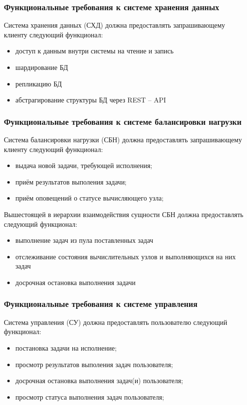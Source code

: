 \documentclass[a4paper,12pt]{report}
\numberwithin{equation}{section}
\begin{document}
\subsubsection{Функциональные требования к системе хранения данных}
Система хранения данных (СХД) должна предоставлять запрашивающему клиенту следующий функционал:
\begin{itemize}
  \item доступ к данным внутри системы на чтение и запись
  \item шардирование БД
  \item репликацию БД
  \item абстрагирование структуры БД через REST -- API
\end{itemize}

\subsubsection{Функциональные требования к системе балансировки нагрузки}
Система балансировки нагрузки (СБН) должна предоставлять запрашивающему клиенту следующий функционал:
\begin{itemize}
  \item выдача новой задачи, требующей исполнения;
  \item приём результатов выполения задачи;
  \item приём оповещений о статусе вычисляющего узла;
\end{itemize}

Вышестоящей в иерархии взаимодействия сущности СБН должна предоставлять следующий функционал:
\begin{itemize}
  \item выполнение задач из пула поставленных задач
  \item отслеживание состояния вычислительных узлов и выполняющихся на них задач
  \item досрочная остановка выполнения задачи
\end{itemize}

\subsubsection{Функциональные требования к системе управления}
Система управления (СУ) должна предоставлять пользователю следующий функционал:
\begin{itemize}
  \item постановка задачи на исполнение;
  \item просмотр результатов выполения задач пользователя;
  \item досрочная остановка выполнения задач(и) пользователя;
  \item просмотр статуса выполнения задач пользователя;
\end{itemize}
\end{document}
